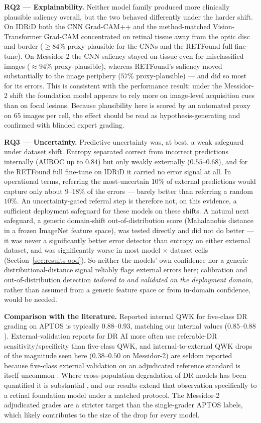 \documentclass[journal]{IEEEtran}
\begin{document}
\textbf{RQ2 --- Explainability.} Neither model family produced more clinically
plausible saliency overall, but the two behaved differently under the harder
shift. On IDRiD both the CNN Grad-CAM++ and the method-matched Vision-Transformer
Grad-CAM concentrated on retinal tissue away from the optic disc and border
($\geq 84\%$ proxy-plausible for the CNNs and the RETFound full fine-tune). On
Messidor-2 the CNN saliency stayed on-tissue even for misclassified images
($\approx 94\%$ proxy-plausible), whereas RETFound's saliency moved substantially
to the image periphery ($57\%$ proxy-plausible) --- and did so most for its
errors. This is consistent with the performance result: under the Messidor-2
shift the foundation model appears to rely more on image-level acquisition cues
than on focal lesions. Because plausibility here is scored by an automated proxy
on $65$ images per cell, the effect should be read as hypothesis-generating and
confirmed with blinded expert grading.

\textbf{RQ3 --- Uncertainty.} Predictive uncertainty was, at best, a weak
safeguard under dataset shift. Entropy separated correct from incorrect
predictions internally (AUROC up to $0.84$) but only weakly externally
($0.55$--$0.68$), and for the RETFound full fine-tune on IDRiD it carried no error
signal at all. In operational terms, referring the most-uncertain $10\%$ of
external predictions would capture only about $9$--$18\%$ of the errors --- barely
better than referring a random $10\%$. An uncertainty-gated referral step is
therefore not, on this evidence, a sufficient deployment safeguard for these
models on these shifts. A natural next safeguard, a generic domain-shift
out-of-distribution score (Mahalanobis distance in a frozen ImageNet feature
space), was tested directly and did not do better --- it was never a
significantly better error detector than entropy on either external dataset,
and was significantly worse in most model $\times$ dataset cells
(Section~\ref{sec:results-ood}). So neither the models' own confidence nor a
generic distributional-distance signal reliably flags external errors here;
calibration and out-of-distribution detection \emph{tailored to and validated
on the deployment domain}, rather than assumed from a generic feature space or
from in-domain confidence, would be needed.

\textbf{Comparison with the literature.} Reported internal QWK for five-class DR
grading on APTOS is typically $0.88$--$0.93$, matching our internal values
($0.85$--$0.88$). External-validation reports for DR AI more often use
referable-DR sensitivity/specificity than five-class QWK, and
internal-to-external QWK drops of the magnitude seen here ($0.38$--$0.50$ on
Messidor-2) are seldom reported because five-class external validation on an
adjudicated reference standard is itself uncommon \cite{grzybowski2020review}.
Where cross-population degradation of DR models has been quantified it is
substantial \cite{dai2021spectrum,beede2020}, and our results extend that
observation specifically to a retinal foundation model under a matched protocol.
The Messidor-2 adjudicated grades \cite{krause2018} are a stricter target than the
single-grader APTOS labels, which likely contributes to the size of the drop for
every model.
\end{document}
